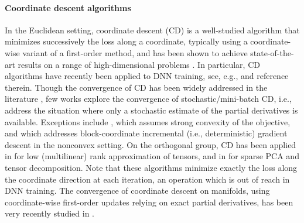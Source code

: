\documentclass{article}
\newcommand{\emcomm}[1]{{\color{orange} #1}}
\begin{document}
\paragraph{Coordinate descent algorithms}
In the Euclidean setting, coordinate descent (CD) is a well-studied algorithm that minimizes successively the loss along a coordinate, typically using a coordinate-wise variant of a first-order method, and has been shown to achieve state-of-the-art results on a range of high-dimensional problems \cite{Wright2015}. In particular, CD algorithms have recently been applied to DNN training, see, e.g., \cite{Zheng2019,Palagi2019} and reference therein. Though the convergence of CD has been widely addressed in the literature \cite{Patrascu2014,Wright2015,Zheng2019},  few works explore the convergence of stochastic/mini-batch CD, i.e., address the situation where only a stochastic estimate of the partial derivatives is available. Exceptions include \cite{Wang2014,Zhao2014}, which assumes strong convexity of the objective, and \cite{Palagi2021} which addresses  block-coordinate incremental (i.e., deterministic) gradient descent in the nonconvex setting. On the orthogonal group, CD has been applied in \cite{Ishteva2013} for low (multilinear) rank approximation of tensors, and in \cite{Shalit2014} for sparse PCA and tensor decomposition. Note that these algorithms minimize exactly the loss along the coordinate direction at each iteration, an operation which is out of reach in DNN training. The convergence of coordinate descent on manifolds, using coordinate-wise first-order updates relying on exact partial derivatives, has been very recently studied  in \cite{Gutman2020}. 
\end{document}
